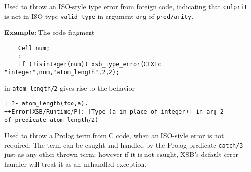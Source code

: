 \begin{description}
%
Used to throw an ISO-style type error from foreign code, indicating
that {\tt culprit} is not in ISO type {\tt valid\_type} in argument
{\tt arg} of {\tt pred/arity}.

{\bf Example}: The code fragment
%
\begin{verbatim}
    Cell num;
    : 
    if (!isinteger(num)) xsb_type_error(CTXTc "integer",num,"atom_length",2,2);
\end{verbatim}
in {\tt atom\_length/2} gives rise to the behavior
%
\begin{verbatim}
| ?- atom_length(foo,a).
++Error[XSB/Runtime/P]: [Type (a in place of integer)] in arg 2 
of predicate atom_length/2)
\end{verbatim}


%
Used to throw a Prolog term from C code, when an ISO-style error is
not required.  The term can be caught and handled by the Prolog
predicate {\tt catch/3} just as any other thrown term; however if it
is not caught, XSB's default error handler will treat it as an
unhandled exception.

\end{description}
